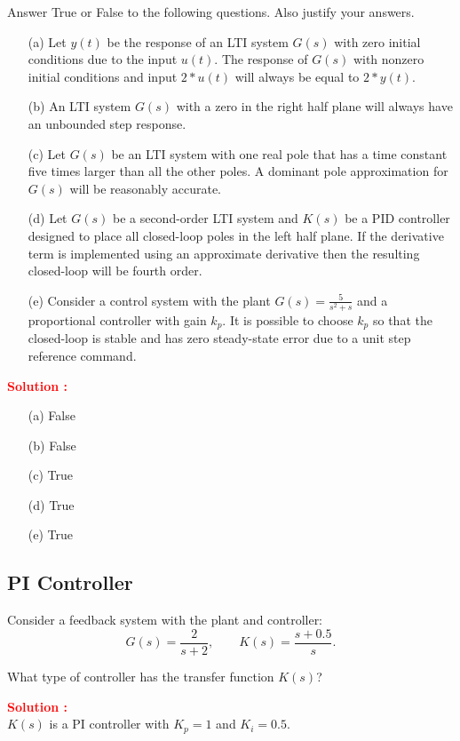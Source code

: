 \documentclass[12pt]{article}
\begin{document}
Answer True or False to the following questions. Also justify your answers.
\begin{itemize}
    \item[(a)] Let \(y(t)\) be the response of an LTI system \(G(s)\) with zero initial conditions due to the input \(u(t)\). The response of \(G(s)\) with nonzero initial conditions and input \(2*u(t)\) will always be equal to \(2*y(t)\).
    \item[(b)] An LTI system \(G(s)\) with a zero in the right half plane will always have an unbounded step response.
    \item[(c)] Let \(G(s)\) be an LTI system with one real pole that has a time constant five times larger than all the other poles. A dominant pole approximation for \(G(s)\) will be reasonably accurate.
    \item[(d)]Let \(G(s)\) be a second-order LTI system and \(K(s)\) be a PID controller designed to place all closed-loop poles in the left half plane. If the derivative term is implemented using an approximate derivative then the resulting closed-loop will be fourth order.
    \item[(e)] Consider a control system with the plant \(G(s) = \frac{5}{s^2+s}\) and a proportional controller with gain \(k_p\). It is possible to choose \(k_p\) so that the closed-loop is stable and has zero steady-state error due to a unit step reference command.
\end{itemize}
\textbf{\textcolor{red}{Solution :}} \\
\begin{itemize}
    \item[(a)] False
    \item[(b)] False
    \item[(c)] True
    \item[(d)] True
    \item[(e)] True
\end{itemize}

\clearpage
\subsection{PI Controller}

Consider a feedback system with the plant and controller:
$$G(s) = \frac{2}{s+2}, \qquad K(s) = \frac{s+0.5}{s}.$$

 What type of controller has the transfer function $K(s)$?

\textbf{\textcolor{red}{Solution :}} \\
$K(s)$ is a PI controller with $K_p = 1$ and $K_i = 0.5$.
\end{document}
